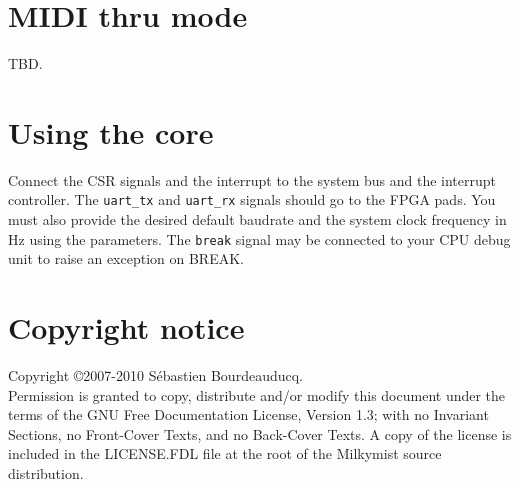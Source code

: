 \documentclass[a4paper,11pt]{article}
\begin{document}
\section{MIDI thru mode}
TBD.

\section{Using the core}
Connect the CSR signals and the interrupt to the system bus and the interrupt controller. The \verb!uart_tx! and \verb!uart_rx! signals should go to the FPGA pads. You must also provide the desired default baudrate and the system clock frequency in Hz using the parameters. The \verb!break!  signal may be connected to your CPU debug unit to raise an exception on BREAK.

\section*{Copyright notice}
Copyright \copyright 2007-2010 S\'ebastien Bourdeauducq. \\
Permission is granted to copy, distribute and/or modify this document under the terms of the GNU Free Documentation License, Version 1.3; with no Invariant Sections, no Front-Cover Texts, and no Back-Cover Texts. A copy of the license is included in the LICENSE.FDL file at the root of the Milkymist source distribution.
\end{document}
